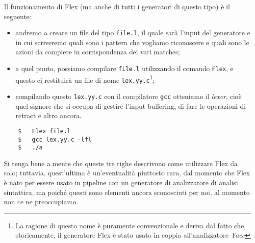 \documentclass[class=book, crop=false, oneside, 12pt]{standalone}
\begin{document}
Il funzionamento di Flex (ma anche di tutti i generatori di questo tipo) è il seguente: 
\begin{itemize}
    \item andremo a creare un file del tipo \texttt{file.l}, il quale sarà l'input del generatore e in cui scriveremo quali sono i pattern che vogliamo riconoscere e quali sono le azioni da compiere in corrispondenza dei vari matches;
    \item a quel punto, possiamo compilare \texttt{file.l} utilizzando il comando \texttt{Flex}, e questo ci restituirà un file di nome \texttt{lex.yy.c}\footnote{La ragione di questo nome è puramente convenzionale e deriva dal fatto che, storicamente, il generatore Flex è stato usato in coppia all'analizzatore \emph{Yacc}};
    \item compilando questo \texttt{lex.yy.c} con il compilatore \texttt{gcc} otteniamo il \emph{lexer}, cioè quel signore che si occupa di gestire l'input buffering, di fare le operazioni di retract e altro ancora.
\end{itemize} 
\begin{verbatim}
    $   Flex file.l
    $   gcc lex.yy.c -lfl
    $   ./a
\end{verbatim}
Si tenga bene a mente che queste tre righe descrivono come utilizzare Flex da solo; tuttavia, quest'ultima è un'eventualità piuttosto rara, dal momento che Flex è nato per essere usato in pipeline con un generatore di analizzatore di analisi sintattica, ma poiché questi sono elementi ancora sconosciuti per noi, al momento non ce ne preoccupiamo.
\end{document}
